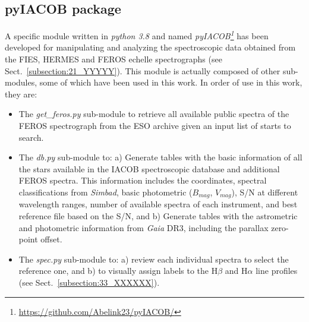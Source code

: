 \documentclass{aa}
\begin{document}

\typeout{}


\begin{appendix}


\section{pyIACOB package}
\label{apen.pyiacob}
A specific module written in \textit{python 3.8} and named \textit{pyIACOB\footnote{\url{https://github.com/Abelink23/pyIACOB/}}} has been developed for manipulating and analyzing the spectroscopic data obtained from the FIES, HERMES and FEROS echelle spectrographs (see Sect.~\ref{subsection:21_YYYYY}). This module is actually composed of other sub-modules, some of which have been used in this work. In order of use in this work, they are:

\begin{itemize}
    \item The \textit{get\_feros.py} sub-module to retrieve all available public spectra of the FEROS spectrograph from the ESO archive given an input list of starts to search. \smallskip
    
    \item The \textit{db.py} sub-module to: a) Generate tables with the basic information of all the stars available in the IACOB spectroscopic database and additional FEROS spectra. This information includes the coordinates, spectral classifications from \textit{Simbad}, basic photometric ($B_{mag}$, $V_{mag}$), S/N at different wavelength ranges, number of available spectra of each instrument, and best reference file based on the S/N, and b) Generate tables with the astrometric and photometric information from {\em Gaia} DR3, including the parallax zero-point offset. \smallskip
    
    \item The \textit{spec.py} sub-module to: a) review each individual spectra to select the reference one, and b) to visually assign labels to the H$\beta$ and H$\alpha$ line profiles (see Sect.~\ref{subsection:33_XXXXXX}). \smallskip
    

\end{itemize}
\end{appendix}
\end{document}
